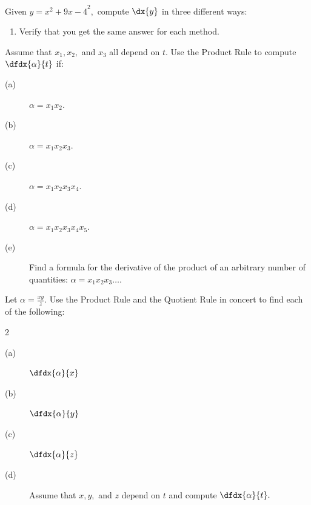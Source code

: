 \begin{ProblemSection}

   \begin{embeddedproblem}{}
     Given $y={x^2+9x-4}^2,$ compute $\dx{y}$ in three different ways:
     \begin{enumerate}[label={\bf{}(\alph*)}]
     \item Verify that you get the same answer for each method.
     \end{enumerate}
   \end{embeddedproblem}

   \begin{embeddedproblem}{}\label{prob:1}
     Assume that $x_1, x_2,$ and $x_3$ all depend on $t.$ Use the
     Product Rule to compute $\dfdx{\alpha}{t}$ if:
     \begin{description}
     \item[(a)] $\alpha=x_1x_2.$
     \item[(b)] $\alpha=x_1x_2x_3.$
     \item[(c)] $\alpha=x_1x_2x_3x_4.$
     \item[(d)] $\alpha=x_1x_2x_3x_4x_5.$
     \item[(e)] Find a formula for the derivative of the product of an
       arbitrary number of quantities: $\alpha=x_1x_2x_3\ldots.$
     \end{description}
   \end{embeddedproblem}

    \begin{embeddedproblem}{}
      Let $\alpha=\frac{xy}{z}.$ Use the Product Rule and the Quotient
      Rule in concert to find each of the following:
      \begin{multicols}{2}
        \begin{description}
        \item[(a)] $\dfdx{\alpha}{x}$
        \item[(b)] $\dfdx{\alpha}{y}$
        \item[(c)] $\dfdx{\alpha}{z}$
        \item[(d)] Assume that $x, y,$ and $z$ depend on $t$ and
          compute $\dfdx{\alpha}{t}.$
        \end{description}
      \end{multicols}
    \end{embeddedproblem}


\end{ProblemSection}
